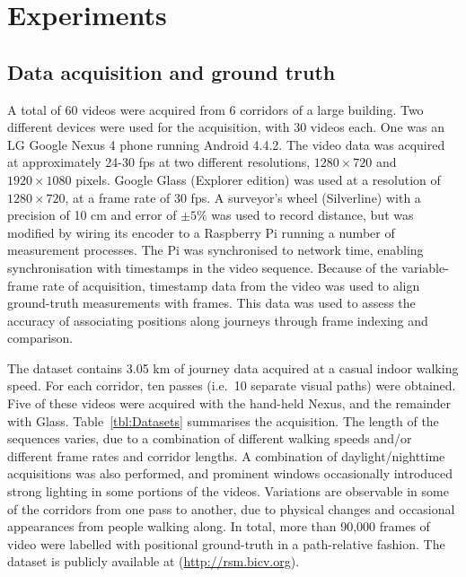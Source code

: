 \section{Experiments}
\label{sec:exp_methods}

\subsection{Data acquisition and ground truth}
\label{sec:Dataset}

A total of 60 videos were acquired from 6 corridors of a large building.  Two different devices were used for the acquisition, with 30 videos each. One was an LG Google Nexus 4 phone running Android 4.4.2.  The video data was acquired at approximately 24-30 fps at two different resolutions, $1280 \times 720$ and $1920\times 1080$ pixels.  Google Glass (Explorer edition) was used at a resolution of $1280 \times 720$, at a frame rate of 30 fps.  A surveyor's wheel (Silverline) with a precision of 10 cm and error of $\pm 5\%$ was used to record distance, but was modified by wiring its encoder to a Raspberry Pi running a number of measurement processes.  The Pi was synchronised to network time, enabling synchronisation with timestamps in the video sequence.  Because of the variable-frame rate of acquisition, timestamp data from the video was used to align ground-truth measurements with frames. This data was used to assess the accuracy of associating positions along journeys through frame indexing and comparison.

The dataset contains 3.05 km of journey data acquired at a casual indoor walking speed.  For each corridor, ten passes (i.e.\ 10 separate visual paths) were obtained. Five of these videos were acquired with the hand-held Nexus, and the remainder with Glass.  Table~\ref{tbl:Datasets} summarises the acquisition.  The length of the sequences varies, due to a combination of different walking speeds and/or different frame rates and corridor lengths. A combination of daylight/nighttime acquisitions was also performed, and prominent windows occasionally introduced strong lighting in some portions of the videos.  Variations are observable in some of the corridors from one pass to another, due to physical changes and occasional appearances from people walking along. In total, more than 90,000 frames of video were labelled with positional ground-truth in a path-relative fashion. The dataset is publicly available  at \citep{Rivera-Rubio2014} (\url{http://rsm.bicv.org}).

